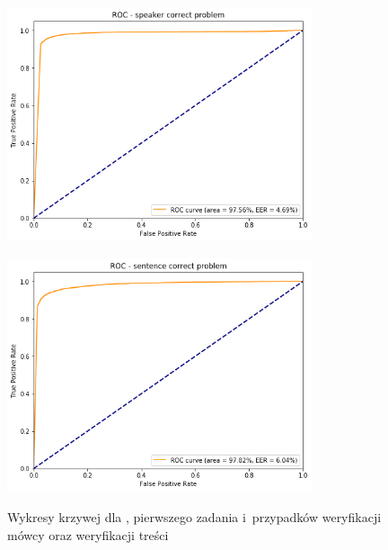 \begin{figure}[H]
    \centering
    \begin{minipage}{.5\textwidth}
        \centering
        \includegraphics[width=0.8\textwidth]{images/4_3_gmm_roc_speaker}
        \label{fig:4_3_gmm_roc_speaker}
    \end{minipage}%
    \begin{minipage}{.5\textwidth}
        \centering
        \includegraphics[width=0.8\textwidth]{images/4_3_gmm_roc_sentence}
        \label{fig:4_3_gmm_roc_sentence}
    \end{minipage}
    \caption{Wykresy krzywej  dla , pierwszego zadania  i~przypadków weryfikacji mówcy oraz weryfikacji treści}
\end{figure}

